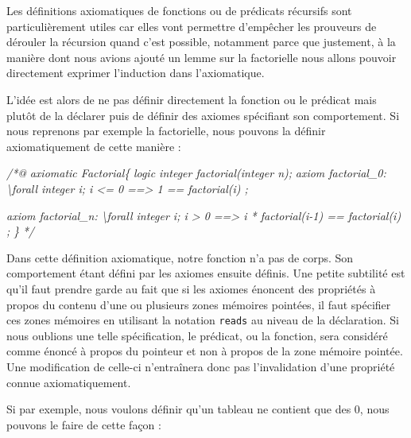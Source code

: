 \documentclass[12pt,francais,]{scrbook}
\newenvironment{Shaded}{}{}
\newcommand{\CommentTok}[1]{\textcolor[rgb]{0.38,0.63,0.69}{\textit{{#1}}}}
\begin{document}
Les définitions axiomatiques de fonctions ou de prédicats récursifs sont
particulièrement utiles car elles vont permettre d'empêcher les
prouveurs de dérouler la récursion quand c'est possible, notamment parce
que justement, à la manière dont nous avions ajouté un lemme sur la
factorielle nous allons pouvoir directement exprimer l'induction dans
l'axiomatique.

L'idée est alors de ne pas définir directement la fonction ou le
prédicat mais plutôt de la déclarer puis de définir des axiomes
spécifiant son comportement. Si nous reprenons par exemple la
factorielle, nous pouvons la définir axiomatiquement de cette manière :

\begin{footnotesize}\begin{Shaded}
\begin{Highlighting}[]
\CommentTok{/*@}
\CommentTok{  axiomatic Factorial\{}
\CommentTok{    logic integer factorial(integer n);}
\CommentTok{    }
\CommentTok{    axiom factorial_0:}
\CommentTok{      \textbackslash{}forall integer i; i <= 0 ==> 1 == factorial(i) ;}

\CommentTok{    axiom factorial_n:}
\CommentTok{      \textbackslash{}forall integer i; i > 0 ==> i * factorial(i-1) == factorial(i) ;}
\CommentTok{  \}}
\CommentTok{*/}
\end{Highlighting}
\end{Shaded}\end{footnotesize}

Dans cette définition axiomatique, notre fonction n'a pas de corps. Son
comportement étant défini par les axiomes ensuite définis. Une petite
subtilité est qu'il faut prendre garde au fait que si les axiomes
énoncent des propriétés à propos du contenu d'une ou plusieurs zones
mémoires pointées, il faut spécifier ces zones mémoires en utilisant la
notation \texttt{reads} au niveau de la déclaration. Si nous oublions
une telle spécification, le prédicat, ou la fonction, sera considéré
comme énoncé à propos du pointeur et non à propos de la zone mémoire
pointée. Une modification de celle-ci n'entraînera donc pas
l'invalidation d'une propriété connue axiomatiquement.

Si par exemple, nous voulons définir qu'un tableau ne contient que des
0, nous pouvons le faire de cette façon :
\end{document}
